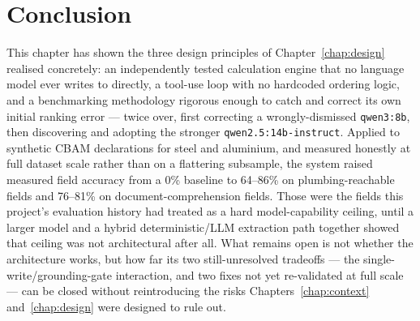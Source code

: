 \section{Conclusion}

This chapter has shown the three design principles of
Chapter~\ref{chap:design} realised concretely: an independently tested
calculation engine that no language model ever writes to directly, a
tool-use loop with no hardcoded ordering logic, and a benchmarking
methodology rigorous enough to catch and correct its own initial ranking
error --- twice over, first correcting a wrongly-dismissed
\texttt{qwen3:8b}, then discovering and adopting the stronger
\texttt{qwen2.5:14b-instruct}. Applied to synthetic CBAM declarations for
steel and aluminium, and measured honestly at full dataset scale rather
than on a flattering subsample, the system raised measured field
accuracy from a 0\% baseline to 64--86\% on plumbing-reachable fields and
76--81\% on document-comprehension fields. Those were the fields this
project's evaluation history had treated as a hard model-capability
ceiling, until a larger model and a hybrid deterministic/LLM extraction
path together showed that ceiling was not architectural after all. What
remains open is not whether the architecture works, but how far its two
still-unresolved tradeoffs --- the single-write/grounding-gate
interaction, and two fixes not yet re-validated at full scale --- can be
closed without reintroducing the risks Chapters~\ref{chap:context}
and~\ref{chap:design} were designed to rule out.
